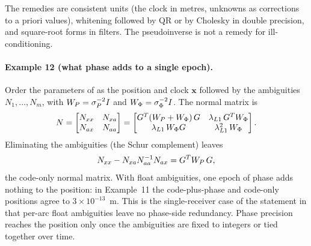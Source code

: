 \documentclass[main.tex]{subfiles}
\begin{document}
The remedies are consistent units (the clock in metres, unknowns as
corrections to a priori values), whitening followed by QR or by Cholesky in
double precision, and square-root forms in filters.  The pseudoinverse is
not a remedy for ill-conditioning.

\paragraph{Example 12 (what phase adds to a single epoch).}
\label{la:ex12}%
Order the parameters of  as the position and clock
$\bm{x}$ followed by the ambiguities $N_1,\dots,N_m$, with
$W_P = \sigma_P^{-2}I$ and
$W_\Phi = \sigma_\Phi^{-2}I$.  The normal matrix is
\begin{equation}
N =
\begin{bmatrix}
N_{xx} & N_{xa} \\ N_{ax} & N_{aa}
\end{bmatrix}
=
\begin{bmatrix}
G^{T}(W_P + W_\Phi)\,G
  & \lambda_{L1}\,G^{T}W_\Phi \\
\lambda_{L1}\,W_\Phi G & \lambda_{L1}^2\,W_\Phi
\end{bmatrix}.
\label{eq:la-partition}
\end{equation}
Eliminating the ambiguities (the Schur complement) leaves
\begin{equation}
N_{xx} - N_{xa}N_{aa}^{-1}N_{ax} = G^{T}W_P\,G,
\label{eq:la-schur}
\end{equation}
the code-only normal matrix.  With float ambiguities, one epoch of phase
adds nothing to the position: in Example~11 the code-plus-phase and
code-only positions agree to $3\times10^{-13}$~m.  This is the
single-receiver case of the statement in  that per-arc
float ambiguities leave no phase-side redundancy.  Phase precision reaches
the position only once the ambiguities are fixed to integers or tied
together over time.
\end{document}
